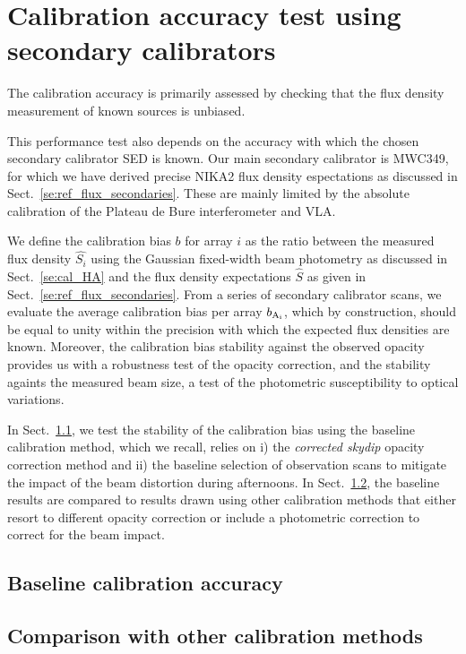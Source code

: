 

\section{Calibration accuracy test using secondary calibrators}
\label{se:calibration_bias}

The calibration accuracy is primarily assessed by checking
that the flux density measurement of known sources is unbiased.

This performance test also depends on the accuracy with which the
chosen secondary calibrator SED is known. Our main secondary
calibrator is MWC349, for which we have derived precise NIKA2 flux
density espectations as discussed in
Sect.~\ref{se:ref_flux_secondaries}.
These are mainly limited by the absolute calibration of the Plateau de
Bure interferometer and VLA.

We define the calibration bias $b$ for array $i$ as
the ratio between the measured flux density $\hat{S_{i}}$ using the
Gaussian fixed-width beam photometry as discussed in
Sect.~\ref{se:cal_HA} and the flux density expectations $\hat{S}$ as
given in Sect.~\ref{se:ref_flux_secondaries}. From a series of
secondary calibrator scans, we evaluate the average calibration bias
per array $b_{\rm A_i}$, which by construction, should be equal to
unity within the precision with which the expected flux densities are
known. Moreover, the calibration bias stability against the observed
opacity provides us with a robustness test of the opacity correction,
and the stability againts the measured beam size, a test of the
photometric susceptibility to optical variations.

In Sect.~\ref{se:baseline_bias}, we test the stability of the
calibration bias using the baseline calibration method, which we
recall, relies on i) the \emph{corrected skydip} opacity correction method
and ii) the baseline selection of observation scans to mitigate the impact
of the beam distortion during afternoons. In
Sect.~\ref{se:other_bias}, the baseline results are compared to
results drawn using other calibration methods that either resort to different
opacity correction or include a photometric correction to correct for
the beam impact. 


\subsection{Baseline calibration accuracy}
\label{se:baseline_bias}


\subsection{Comparison with other calibration methods}
\label{se:other_bias}
